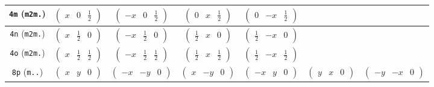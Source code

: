 \documentclass[fleqn,9pt,landscape]{jsarticle}
\begin{document}
\begin{center}
\begin{longtable}{ccccccc}
{\tt 4m} ({\tt m2m.}) & $ \begin{pmatrix} x & 0 & \frac{1}{2} \end{pmatrix} $ & $ \begin{pmatrix} - x & 0 & \frac{1}{2} \end{pmatrix} $ & $ \begin{pmatrix} 0 & x & \frac{1}{2} \end{pmatrix} $ & $ \begin{pmatrix} 0 & - x & \frac{1}{2} \end{pmatrix} $ & $  $ & $  $ \\ \hline
{\tt 4n} ({\tt m2m.}) & $ \begin{pmatrix} x & \frac{1}{2} & 0 \end{pmatrix} $ & $ \begin{pmatrix} - x & \frac{1}{2} & 0 \end{pmatrix} $ & $ \begin{pmatrix} \frac{1}{2} & x & 0 \end{pmatrix} $ & $ \begin{pmatrix} \frac{1}{2} & - x & 0 \end{pmatrix} $ & $  $ & $  $ \\ \hline
{\tt 4o} ({\tt m2m.}) & $ \begin{pmatrix} x & \frac{1}{2} & \frac{1}{2} \end{pmatrix} $ & $ \begin{pmatrix} - x & \frac{1}{2} & \frac{1}{2} \end{pmatrix} $ & $ \begin{pmatrix} \frac{1}{2} & x & \frac{1}{2} \end{pmatrix} $ & $ \begin{pmatrix} \frac{1}{2} & - x & \frac{1}{2} \end{pmatrix} $ & $  $ & $  $ \\ \hline
{\tt 8p} ({\tt m..}) & $ \begin{pmatrix} x & y & 0 \end{pmatrix} $ & $ \begin{pmatrix} - x & - y & 0 \end{pmatrix} $ & $ \begin{pmatrix} x & - y & 0 \end{pmatrix} $ & $ \begin{pmatrix} - x & y & 0 \end{pmatrix} $ & $ \begin{pmatrix} y & x & 0 \end{pmatrix} $ & $ \begin{pmatrix} - y & - x & 0 \end{pmatrix} $ \\

\end{longtable}
\end{center}
\end{document}
